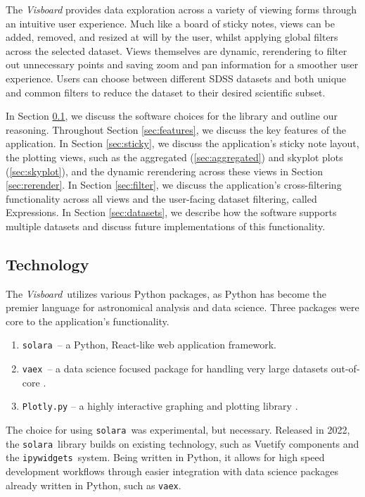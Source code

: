 \documentclass[a4paper,10pt,twocolumn]{article}
\newcommand{\solara}{\texttt{solara}}
\newcommand{\vaex}{\texttt{vaex}}
\newcommand{\visboard}{\emph{Visboard}}
\begin{document}
The \emph{Visboard} provides data exploration across a variety of viewing forms through an intuitive user experience. Much like a board of sticky notes, views can be added, removed, and resized at will by the user, whilst applying global filters across the selected dataset. Views themselves are dynamic, rerendering to filter out unnecessary points and saving zoom and pan information for a smoother user experience. Users can choose between different SDSS datasets and both unique and common filters to reduce the dataset to their desired scientific subset.

In Section \ref{sec:tech}, we discuss the software choices for the library and outline our reasoning. Throughout Section \ref{sec:features}, we discuss the key features of the application. In Section \ref{sec:sticky}, we discuss the application's sticky note layout, the plotting views, such as the aggregated (\ref{sec:aggregated}) and skyplot plots (\ref{sec:skyplot}), and the dynamic rerendering across these views in Section \ref{sec:rerender}. In Section \ref{sec:filter}, we discuss the application's cross-filtering functionality across all views and the user-facing dataset filtering, called Expressions. In Section \ref{sec:datasets}, we describe how the software supports multiple datasets and discuss future implementations of this functionality.

\subsection{Technology}
\label{sec:tech}
The \visboard\, utilizes various Python packages, as Python has become the premier language for astronomical analysis and data science. Three packages were core to the application's functionality.

\begin{enumerate}
	\item \solara\, -- a Python, React-like web application framework.
	\item \vaex\, -- a data science focused package for handling very large datasets out-of-core \parencite{vaex}.
	\item \texttt{Plotly.py} -- a highly interactive graphing and plotting library \parencite{plotly}.
\end{enumerate}

The choice for using \solara\, was experimental, but necessary. Released in 2022, the \solara\, library builds on existing technology, such as Vuetify components and the \texttt{ipywidgets}\, system. Being written in Python, it allows for high speed development workflows through easier integration with data science packages already written in Python, such as \vaex.
\end{document}
